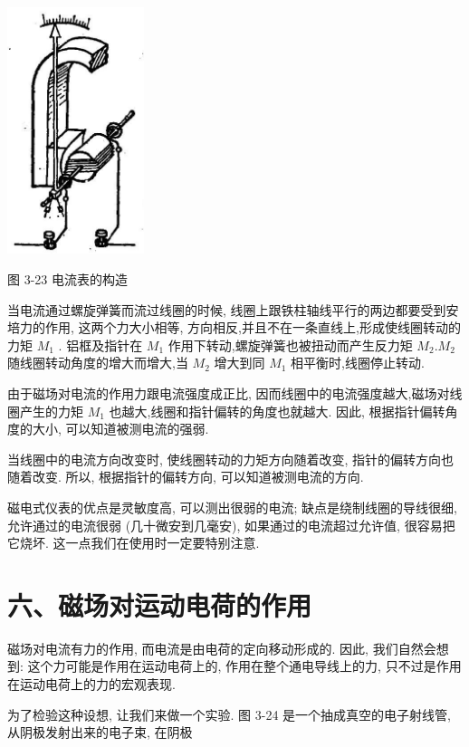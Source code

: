 \documentclass[10pt]{article}
\begin{document}
\begin{center}
\includegraphics[max width=0.3\textwidth]{images/01913056-1f15-74d8-9184-9aab52c9d66b_117_535425.jpg}
\end{center}

图 3-23 电流表的构造

当电流通过螺旋弹簧而流过线圈的时候, 线圈上跟铁柱轴线平行的两边都要受到安培力的作用, 这两个力大小相等, 方向相反,并且不在一条直线上,形成使线圈转动的力矩 \({M}_{1}\) . 铝框及指针在 \({M}_{1}\) 作用下转动,螺旋弹簧也被扭动而产生反力矩 \({M}_{2}.{M}_{2}\) 随线圈转动角度的增大而增大,当 \({M}_{2}\) 增大到同 \({M}_{1}\) 相平衡时,线圈停止转动.

由于磁场对电流的作用力跟电流强度成正比, 因而线圈中的电流强度越大,磁场对线圈产生的力矩 \({M}_{1}\) 也越大,线圈和指针偏转的角度也就越大. 因此, 根据指针偏转角度的大小, 可以知道被测电流的强弱.

当线圈中的电流方向改变时, 使线圈转动的力矩方向随着改变, 指针的偏转方向也随着改变. 所以, 根据指针的偏转方向, 可以知道被测电流的方向.

磁电式仪表的优点是灵敏度高, 可以测出很弱的电流; 缺点是绕制线圈的导线很细, 允许通过的电流很弱 (几十微安到几毫安), 如果通过的电流超过允许值, 很容易把它烧坏. 这一点我们在使用时一定要特别注意.

\section*{六、磁场对运动电荷的作用}

磁场对电流有力的作用, 而电流是由电荷的定向移动形成的. 因此, 我们自然会想到: 这个力可能是作用在运动电荷上的, 作用在整个通电导线上的力, 只不过是作用在运动电荷上的力的宏观表现.

为了检验这种设想, 让我们来做一个实验. 图 3-24 是一个抽成真空的电子射线管, 从阴极发射出来的电子束, 在阴极
\end{document}
